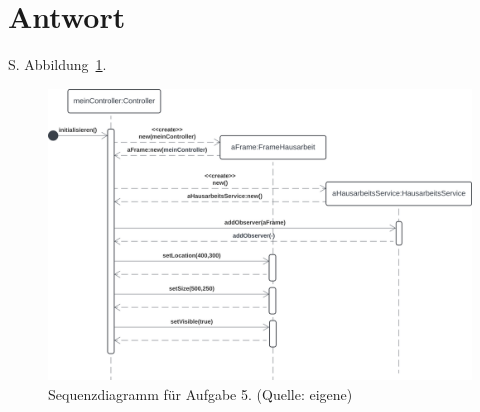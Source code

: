 \section{Antwort}

S. Abbildung~\ref{fig:aufgabe5}.\\

\begin{figure}
    \centering
    \includegraphics[scale=0.35]{chapters/aufgabe 5/img/aufgabe5}
    \caption{Sequenzdiagramm für Aufgabe 5. (Quelle: eigene)}
    \label{fig:aufgabe5}
\end{figure}

